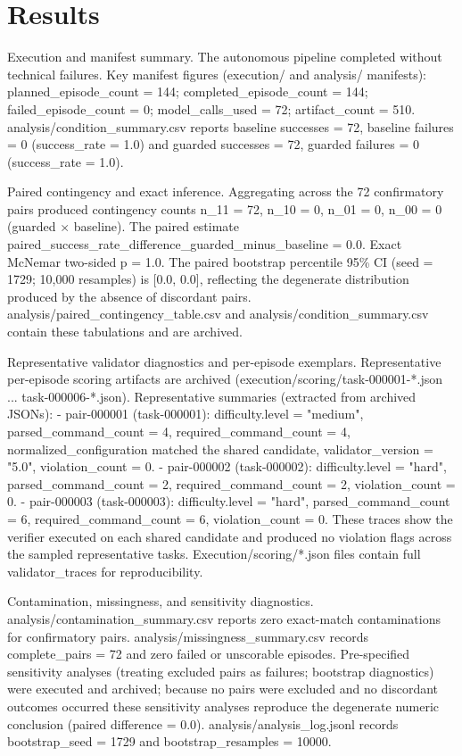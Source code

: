\documentclass[conference]{IEEEtran}
\begin{document}
\section{Results}
Execution and manifest summary. The autonomous pipeline completed without technical failures. Key manifest figures (execution/ and analysis/ manifests): planned\_episode\_count = 144; completed\_episode\_count = 144; failed\_episode\_count = 0; model\_calls\_used = 72; artifact\_count = 510. analysis/condition\_summary.csv reports baseline successes = 72, baseline failures = 0 (success\_rate = 1.0) and guarded successes = 72, guarded failures = 0 (success\_rate = 1.0).

Paired contingency and exact inference. Aggregating across the 72 confirmatory pairs produced contingency counts n\_11 = 72, n\_10 = 0, n\_01 = 0, n\_00 = 0 (guarded \ensuremath{\times} baseline). The paired estimate paired\_success\_rate\_difference\_guarded\_minus\_baseline = 0.0. Exact McNemar two-sided p = 1.0. The paired bootstrap percentile 95\% CI (seed = 1729; 10,000 resamples) is [0.0, 0.0], reflecting the degenerate distribution produced by the absence of discordant pairs. analysis/paired\_contingency\_table.csv and analysis/condition\_summary.csv contain these tabulations and are archived.

Representative validator diagnostics and per-episode exemplars. Representative per-episode scoring artifacts are archived (execution/scoring/task-000001-*.json ... task-000006-*.json). Representative summaries (extracted from archived JSONs):
- pair-000001 (task-000001): difficulty.level = "medium", parsed\_command\_count = 4, required\_command\_count = 4, normalized\_configuration matched the shared candidate, validator\_version = "5.0", violation\_count = 0.
- pair-000002 (task-000002): difficulty.level = "hard", parsed\_command\_count = 2, required\_command\_count = 2, violation\_count = 0.
- pair-000003 (task-000003): difficulty.level = "hard", parsed\_command\_count = 6, required\_command\_count = 6, violation\_count = 0.
These traces show the verifier executed on each shared candidate and produced no violation flags across the sampled representative tasks. Execution/scoring/*.json files contain full validator\_traces for reproducibility.

Contamination, missingness, and sensitivity diagnostics. analysis/contamination\_summary.csv reports zero exact-match contaminations for confirmatory pairs. analysis/missingness\_summary.csv records complete\_pairs = 72 and zero failed or unscorable episodes. Pre-specified sensitivity analyses (treating excluded pairs as failures; bootstrap diagnostics) were executed and archived; because no pairs were excluded and no discordant outcomes occurred these sensitivity analyses reproduce the degenerate numeric conclusion (paired difference = 0.0). analysis/analysis\_log.jsonl records bootstrap\_seed = 1729 and bootstrap\_resamples = 10000.
\end{document}
